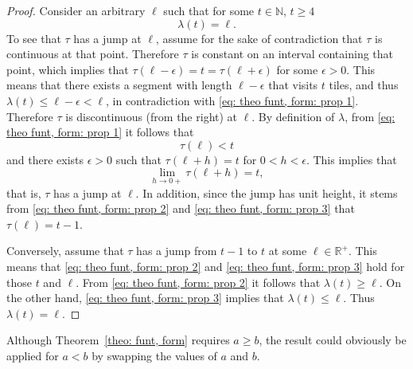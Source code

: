 \documentclass[12pt, a4paper]{article}
\newcommand{\funt}{\tau} %
\newcommand{\funl}{\lambda} %
\newcommand{\len}{\ell} %
\newcommand{\tiles}{t} %
\begin{document}
\begin{proof}
Consider an arbitrary $\len$ such that for some $\tiles \in \mathbb N$, $\tiles \geq 4$
\begin{equation}
\label{eq: theo funt, form: prop 1}
\funl(\tiles)=\len.
\end{equation}
To see that $\funt$ has a jump at $\len$, assume for the sake of contradiction that $\funt$ is continuous at that point. Therefore $\funt$ is constant on an interval containing that point, which implies that $\funt(\len-\epsilon) = \tiles = \funt(\len+\epsilon)$ for some $\epsilon > 0$. This means that there exists a segment with length $\len-\epsilon$ that visits $\tiles$ tiles, and thus $\funl(\tiles) \leq \len-\epsilon < \len$, in contradiction with \eqref{eq: theo funt, form: prop 1}. Therefore $\funt$ is discontinuous (from the right) at $\len$. By definition of $\funl$, from \eqref{eq: theo funt, form: prop 1} it follows that
\begin{equation}
\label{eq: theo funt, form: prop 2}
\funt(\len) < \tiles
\end{equation}
and there exists $\epsilon > 0$ such that $\funt(\len+h) = \tiles$ for $0 < h < \epsilon$. This implies that
\begin{equation}
\label{eq: theo funt, form: prop 3}
\lim_{h \rightarrow 0+} \funt(\len+h) = \tiles,
\end{equation}
that is, $\funt$ has a jump at $\len$. In addition, since the jump has unit height, it stems from \eqref{eq: theo funt, form: prop 2} and \eqref{eq: theo funt, form: prop 3}  that $\funt(\len) = \tiles-1$.

Conversely, assume that $\funt$ has a jump from $\tiles-1$ to $\tiles$ at some $\len \in \mathbb R^+$. This means that \eqref{eq: theo funt, form: prop 2} and \eqref{eq: theo funt, form: prop 3} hold for those $\tiles$ and $\len$. From \eqref{eq: theo funt, form: prop 2} it follows that  $\funl(\tiles) \geq \len$. On the other hand, \eqref{eq: theo funt, form: prop 3} implies that $\funl(\tiles) \leq \len$. Thus $\funl(\tiles)=\len$.
\end{proof}

Although Theorem~\ref{theo: funt, form} requires $a \geq b$, the result could obviously be applied for $a < b$ by swapping the values of $a$ and $b$.
\end{document}
